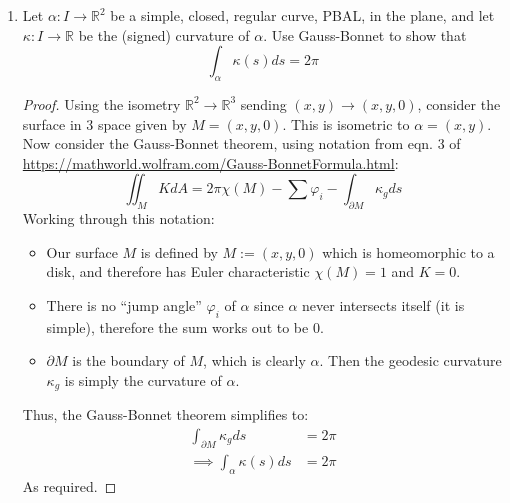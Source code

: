 \documentclass[a4paper,17pt]{extarticle}
\theoremstyle{definition}
\newcommand{\R}{\mathbb{R}}
\begin{document}
\begin{enumerate}
\begin{proof}
\end{proof} (Side note, this proof kind of feels like cheating because the result was in the text. I was trying to find a triangulation of the torus of revolution to show this more concretely but I couldn't find one.)
\item Let $\alpha:I\to\R^2$ be a simple, closed, regular curve, PBAL, in the plane, and let $\kappa:I\to\R$ be the (signed) curvature of $\alpha$. Use Gauss-Bonnet to show that $$\int_{\alpha}\kappa(s)ds=2\pi$$\begin{proof}Using the isometry $\R^2\to\R^3$ sending $(x,y)\to(x,y,0)$, consider the surface in 3 space given by $M=(x,y,0)$. This is isometric to $\alpha=(x,y)$. Now consider the Gauss-Bonnet theorem, using notation from eqn. 3 of \href{https://mathworld.wolfram.com/Gauss-BonnetFormula.html}{https://mathworld.wolfram.com/Gauss-BonnetFormula.html}: $$\iint_MKdA=2\pi\chi(M)-\sum\varphi_i-\int_{\partial M}\kappa_gds$$ Working through this notation:\begin{itemize}
    \item Our surface $M$ is defined by $M:=(x,y,0)$ which is homeomorphic to a disk, and therefore has Euler characteristic $\chi(M)=1$ and $K=0$.
    \item There is no ``jump angle'' $\varphi_i$ of $\alpha$ since $\alpha$ never intersects itself (it is simple), therefore the sum works out to be 0.
    \item $\partial M$ is the boundary of $M$, which is clearly $\alpha$. Then the geodesic curvature $\kappa_g$ is simply the curvature of $\alpha$. 
\end{itemize} Thus, the Gauss-Bonnet theorem simplifies to:\begin{align*}
    \int_{\partial M}\kappa_gds&=2\pi\\ \implies \int_{\alpha}\kappa(s)ds&=2\pi
\end{align*} As required.
\end{proof}
\end{enumerate}
\end{document}

